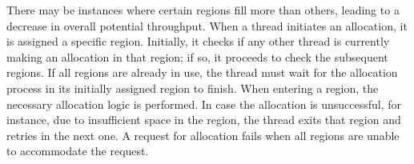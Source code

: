 There may be instances where certain regions fill more than others, leading to a decrease in overall potential throughput. When a thread initiates an allocation, it is assigned a specific region. Initially, it checks if any other thread is currently making an allocation in that region; if so, it proceeds to check the subsequent regions. If all regions are already in use, the thread must wait for the allocation process in its initially assigned region to finish. When entering a region, the necessary allocation logic is performed. In case the allocation is unsuccessful, for instance, due to insufficient space in the region, the thread exits that region and retries in the next one. A request for allocation fails when all regions are unable to accommodate the request.
